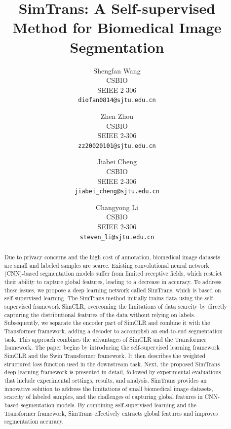 \documentclass[10pt,twocolumn,letterpaper]{article}
\def\confName{CVPR}
\begin{document}
\title{SimTrans: A Self-supervised Method for Biomedical Image Segmentation}

\author{Shengfan Wang\\
CSBIO\\
SEIEE 2-306\\
{\tt\small diofan0814@sjtu.edu.cn}
\and
Zhen Zhou\\
CSBIO\\
SEIEE 2-306\\
{\tt\small zz20020101@sjtu.edu.cn}
\and
Jiabei Cheng\\
CSBIO\\
SEIEE 2-306\\
{\tt\small jiabei\_cheng@sjtu.edu.cn}
\and
Changyong Li\\
CSBIO\\
SEIEE 2-306\\
{\tt\small steven\_li@sjtu.edu.cn}
}
\maketitle

\begin{abstract}
  Due to privacy concerns and the high cost of annotation, biomedical image datasets are small and labeled samples are scarce. Existing convolutional neural network (CNN)-based segmentation models suffer from limited receptive fields, which restrict their ability to capture global features, leading to a decrease in accuracy. To address these issues, we propose a deep learning network called SimTrans, which is based on self-supervised learning.
  The SimTrans method initially trains data using the self-supervised framework SimCLR, overcoming the limitations of data scarcity by directly capturing the distributional features of the data without relying on labels. Subsequently, we separate the encoder part of SimCLR and combine it with the Transformer framework, adding a decoder to accomplish an end-to-end segmentation task. This approach combines the advantages of SimCLR and the Transformer framework.
  The paper begins by introducing the self-supervised learning framework SimCLR and the Swin Transformer framework. It then describes the weighted structured loss function used in the downstream task. Next, the proposed SimTrans deep learning framework is presented in detail, followed by experimental evaluations that include experimental settings, results, and analysis.
  SimTrans provides an innovative solution to address the limitations of small biomedical image datasets, scarcity of labeled samples, and the challenges of capturing global features in CNN-based segmentation models. By combining self-supervised learning and the Transformer framework, SimTrans effectively extracts global features and improves segmentation accuracy.
\end{abstract}
\end{document}
